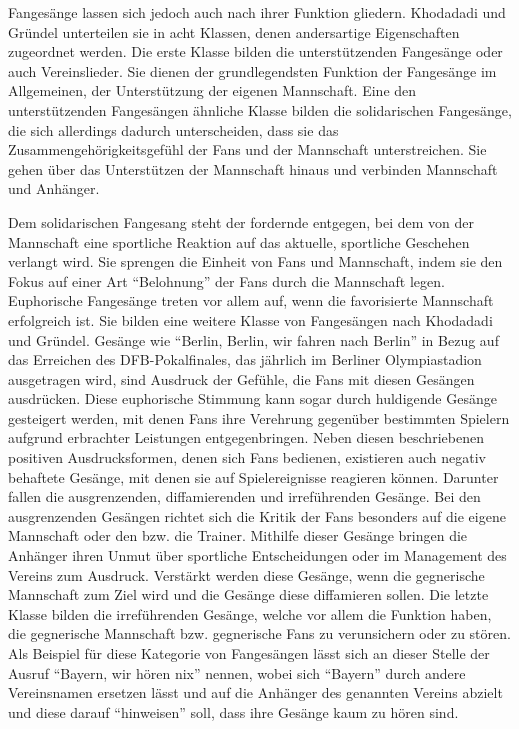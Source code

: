 Fangesänge lassen sich jedoch auch nach ihrer Funktion gliedern. Khodadadi und Gründel unterteilen sie in acht Klassen, denen andersartige Eigenschaften zugeordnet werden.\cite[S. 10]{FK14}
Die erste Klasse bilden die unterstützenden Fangesänge oder auch Vereinslieder.
Sie dienen der grundlegendsten Funktion der Fangesänge im Allgemeinen, der Unterstützung der eigenen Mannschaft.
Eine den unterstützenden Fangesängen ähnliche Klasse bilden die solidarischen Fangesänge, die sich allerdings dadurch unterscheiden, dass sie das Zusammengehörigkeitsgefühl der Fans und der Mannschaft unterstreichen.
Sie gehen über das Unterstützen der Mannschaft hinaus und verbinden Mannschaft und Anhänger.

Dem solidarischen Fangesang steht der fordernde entgegen, bei dem von der Mannschaft eine sportliche Reaktion auf das aktuelle, sportliche Geschehen verlangt wird.
Sie sprengen die Einheit von Fans und Mannschaft, indem sie den Fokus auf einer Art "`Belohnung"' der Fans durch die Mannschaft legen.
Euphorische Fangesänge treten vor allem auf, wenn die favorisierte Mannschaft erfolgreich ist.
Sie bilden eine weitere Klasse von Fangesängen nach Khodadadi und Gründel.
Gesänge wie "`Berlin, Berlin, wir fahren nach Berlin"' in Bezug auf das Erreichen des DFB-Pokalfinales, das jährlich im Berliner Olympiastadion ausgetragen wird, sind Ausdruck der Gefühle, die Fans mit diesen Gesängen ausdrücken.
Diese euphorische Stimmung kann sogar durch huldigende Gesänge gesteigert werden, mit denen Fans ihre Verehrung gegenüber bestimmten Spielern aufgrund erbrachter Leistungen entgegenbringen.
Neben diesen beschriebenen positiven Ausdrucksformen, denen sich Fans bedienen, existieren auch negativ behaftete Gesänge, mit denen sie auf Spielereignisse reagieren können.
Darunter fallen die ausgrenzenden, diffamierenden und irreführenden Gesänge.
Bei den ausgrenzenden Gesängen richtet sich die Kritik der Fans besonders auf die eigene Mannschaft oder den bzw. die Trainer.
Mithilfe dieser Gesänge bringen die Anhänger ihren Unmut über sportliche Entscheidungen oder im Management des Vereins zum Ausdruck.
Verstärkt werden diese Gesänge, wenn die gegnerische Mannschaft zum Ziel wird und die Gesänge diese diffamieren sollen.
Die letzte Klasse bilden die irreführenden Gesänge, welche vor allem die Funktion haben, die gegnerische Mannschaft bzw. gegnerische Fans zu verunsichern oder zu stören.
Als Beispiel für diese Kategorie von Fangesängen lässt sich an dieser Stelle der Ausruf "`Bayern, wir hören nix"' nennen, wobei sich "`Bayern"' durch andere Vereinsnamen ersetzen lässt und auf die Anhänger des genannten Vereins abzielt und diese darauf "`hinweisen"' soll, dass ihre Gesänge kaum zu hören sind.

